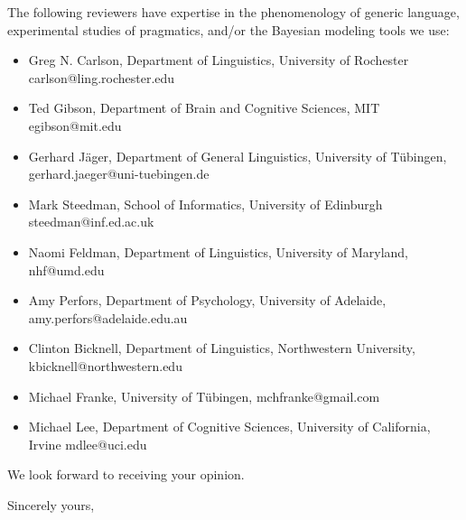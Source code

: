 \documentclass[11pt,letterpaper]{letter} %
\begin{document}
\begin{letter}
The following reviewers have expertise in the phenomenology of generic language, experimental studies of pragmatics, and/or the Bayesian modeling tools we use:

\begin{itemize}
\item Greg N. Carlson, Department of Linguistics, University of Rochester carlson@ling.rochester.edu
\item Ted Gibson, Department of Brain and Cognitive Sciences, MIT egibson@mit.edu
\item Gerhard J{\"a}ger, Department of General Linguistics, University of T{\"u}bingen, gerhard.jaeger@uni-tuebingen.de
\item Mark Steedman, School of Informatics, University of Edinburgh  steedman@inf.ed.ac.uk
\item Naomi Feldman, Department of Linguistics, University of Maryland, nhf@umd.edu
\item Amy Perfors, Department of Psychology, University of Adelaide, amy.perfors@adelaide.edu.au
\item Clinton Bicknell, Department of Linguistics, Northwestern University, kbicknell@northwestern.edu
\item Michael Franke, University of T{\"u}bingen, mchfranke@gmail.com
\item Michael Lee, Department of Cognitive Sciences, University of California, Irvine mdlee@uci.edu
\end{itemize}

We look forward to receiving your opinion.


\closing{Sincerely yours,}


\end{letter}
\end{document}
